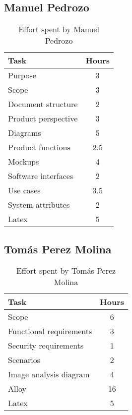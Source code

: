 \subsection{Manuel Pedrozo}

\begin{table}[H]
    \centering
    \begin{tabular}{|p{7cm}|c|}
    \hline
    \textbf{Task} & \textbf{Hours} \\ \hline
    Purpose & 3 \\ \hline
    Scope & 3 \\ \hline
    Document structure & 2 \\ \hline
    Product perspective & 3 \\ \hline
    Diagrams & 5 \\ \hline
    Product functions & 2.5 \\ \hline
    Mockups & 4 \\ \hline
    Software interfaces & 2 \\ \hline
    Use cases & 3.5 \\ \hline
    System attributes & 2 \\ \hline
    Latex & 5 \\ \hline
    \end{tabular}
    \caption{\label{tbl:manuel-effort} Effort spent by Manuel Pedrozo}
    \end{table}

\subsection{Tomás Perez Molina}
\begin{table}[H]
    \centering
    \begin{tabular}{|p{7cm}|c|}
    \hline
    \textbf{Task} & \textbf{Hours} \\ \hline
    Scope & 6 \\ \hline
    Functional requirements & 3 \\ \hline
    Security requirements & 1 \\ \hline
    Scenarios & 2 \\ \hline
    Image analysis diagram & 4 \\ \hline
    Alloy & 16 \\ \hline
    Latex & 5 \\ \hline
    \end{tabular}
    \caption{\label{tbl:tomas-effort} Effort spent by Tomás Perez Molina}
    \end{table}
